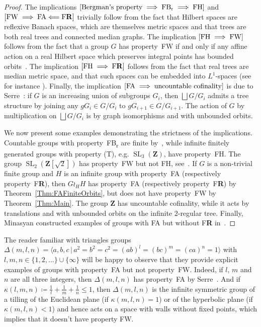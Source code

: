 \documentclass[a4paper]{article}
\theoremstyle{definition}
\DeclareMathOperator\SL{SL}
\newcommand*{\field}[1]{\mathbf{#1}}
\newcommand*{\Z}{\field{Z}}
\newcommand*{\FB}{FB\textsubscript{r}}
\newcommand*{\FH}{FH}
\newcommand*{\FW}{FW}
\newcommand*{\FA}{FA}
\newcommand*{\FR}{F\textbf{R}}
\begin{document}
\begin{proof}
The implications $[\textnormal{Bergman's property}\implies \textnormal{\FB}\implies\textnormal{\FH}]$ and $[\textnormal{\FW}\implies \textnormal{\FA}\Longleftarrow\textnormal{\FR}]$ trivially follow from the fact that Hilbert spaces are reflexive Banach spaces, which are themselves metric spaces and that trees are both real trees and connected median graphs.
The implication $[\textnormal{\FH}\implies \textnormal{\FW}]$ follows from the fact that a group $G$ has property~\FW{} if and only if any affine action on a real Hilbert space which preserves integral points has bounded orbits~\cite[Proposition 7.I.3]{Cornulier2013}.
The implication $[\textnormal{\FH}\implies \textnormal{\FR}]$ follows from the fact that real trees are median metric space, and that such spaces can be embedded into $L^1$-spaces (see for instance \cite[Theorem V.2.4]{Ver93}).
Finally, the implication $[\textnormal{\FA}\implies\textnormal{uncountable cofinality}]$ is due to Serre~\cite{MR0476875}: if $G$ is an increasing union of subgroups $G_i$, then $\bigsqcup G/G_i$ admits a tree structure by joining any $gG_i\in G/G_i$ to $gG_{i+1}\in G/G_{i+1}$.
The action of $G$ by multiplication on $\bigsqcup G/G_i$ is by graph isomorphisms and with unbounded orbits.


We now present some examples demonstrating the strictness of the implications. %
Countable groups with property~\FB{} are finite by~\cite{MR2137870}, while infinite finitely generated groups with property (T), e.g. $\SL_3(\Z)$, have property~\FH.
The group $\SL_2(\Z[\sqrt{2}])$ has property~\FW{} but not \FH, see~\cite{MR3299841}.
If $G$ is a non-trivial finite group and $H$ is an infinite group with property~\FA{} (respectively property~\FR), then $G\wr_HH$ has property~\FA{} (respectively property~\FR) by Theorem~\ref{Thm:FAFiniteOrbits}, but does not have property~\FW{} by Theorem~\ref{Thm:Main}.
The group $\Z$ has uncountable cofinality, while it acts by translations and with unbounded orbits on the infinite $2$-regular tree.
Finally, Minasyan constructed examples of groups with \FA{} but without \FR{} in~\cite{MR3465847}.
\end{proof}
%
%
The reader familiar with triangles groups $\Delta(m,l,n)=\langle a,b,c\,|\,a^2=b^2=c^2=(ab)^l=(bc)^m=(ca)^n=1\rangle$ with $l,m,n\in\{1,2,\dots\}\cup\{\infty\}$ will be happy to observe that they provide explicit examples of groups with property~\FA{} but not property~\FW.
Indeed, if $l$, $m$ and $n$ are all three integers, then $\Delta(m,l,n)$ has property~\FA{} by Serre~\cite[Section 6.5, Corollaire 2]{MR0476875}.
And if $\kappa(l,m,n)\coloneqq\frac1l+\frac1m+\frac1n\leq 1$, then $\Delta(m,l,n)$ is the infinite symmetric group of a tilling of the Euclidean plane (if $\kappa(m,l,n)=1$) or of the hyperbolic plane (if $\kappa(m,l,n)<1$) and hence acts on a space with walls without fixed points, which implies that it doesn't have property FW.
\end{document}

